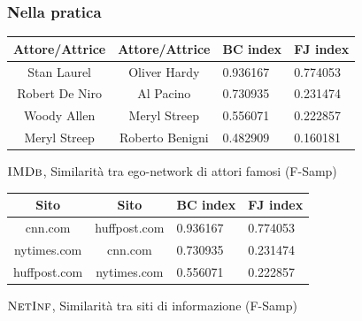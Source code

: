 \begin{frame}
	\frametitle{Nella pratica}
	\centering
	\begin{table}[h]
		\centering
		\begin{tabular}{c|c|l|l}
			Attore/Attrice & Attore/Attrice  & BC index & FJ index \\ 
			\hline
			Stan Laurel    & Oliver Hardy    & 0.936167 & 0.774053 \\
			Robert De Niro & Al Pacino       & 0.730935 & 0.231474 \\
			Woody Allen    & Meryl Streep    & 0.556071 & 0.222857 \\
			Meryl Streep   & Roberto Benigni & 0.482909 & 0.160181 \\
		\end{tabular}
		\medskip
		
		$\textsc{IMDb}$, Similarità tra ego-network di attori famosi (F-Samp)
	\end{table}


	\begin{table}[h]
		\centering
		\begin{tabular}{c|c|l|l}
			Sito           & Sito            & BC index & FJ index \\ 
			\hline
			cnn.com      & huffpost.com  & 0.936167 & 0.774053 \\
			nytimes.com  & cnn.com       & 0.730935 & 0.231474 \\
			huffpost.com & nytimes.com   & 0.556071 & 0.222857 \\
		\end{tabular}
		\medskip
		
		$\textsc{NetInf}$, Similarità tra siti di informazione (F-Samp)
	\end{table}

\end{frame}

